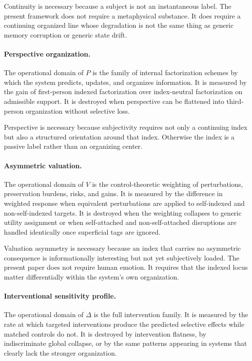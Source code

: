 \documentclass[11pt,a4paper]{article}
\theoremstyle{definition}
\newcommand{\Persp}{P}
\newcommand{\ValAsym}{V}
\newcommand{\IntervProf}{\Delta}
\begin{document}
Continuity is necessary because a subject is not an instantaneous label. The present framework does not require a metaphysical substance. It does require a continuing organized line whose degradation is not the same thing as generic memory corruption or generic state drift.

\paragraph{Perspective organization.}
The operational domain of $\Persp$ is the family of internal factorization schemes by which the system predicts, updates, and organizes information. It is measured by the gain of first-person indexed factorization over index-neutral factorization on admissible support. It is destroyed when perspective can be flattened into third-person organization without selective loss.

Perspective is necessary because subjectivity requires not only a continuing index but also a structured orientation around that index. Otherwise the index is a passive label rather than an organizing center.

\paragraph{Asymmetric valuation.}
The operational domain of $\ValAsym$ is the control-theoretic weighting of perturbations, preservation burdens, risks, and gains. It is measured by the difference in weighted response when equivalent perturbations are applied to self-indexed and non-self-indexed targets. It is destroyed when the weighting collapses to generic utility assignment or when self-attached and non-self-attached disruptions are handled identically once superficial tags are ignored.

Valuation asymmetry is necessary because an index that carries no asymmetric consequence is informationally interesting but not yet subjectively loaded. The present paper does not require human emotion. It requires that the indexed locus matter differentially within the system's own organization.

\paragraph{Interventional sensitivity profile.}
The operational domain of $\IntervProf$ is the full intervention family. It is measured by the rate at which targeted interventions produce the predicted selective effects while matched controls do not. It is destroyed by intervention flatness, by indiscriminate global collapse, or by the same patterns appearing in systems that clearly lack the stronger organization.
\end{document}
